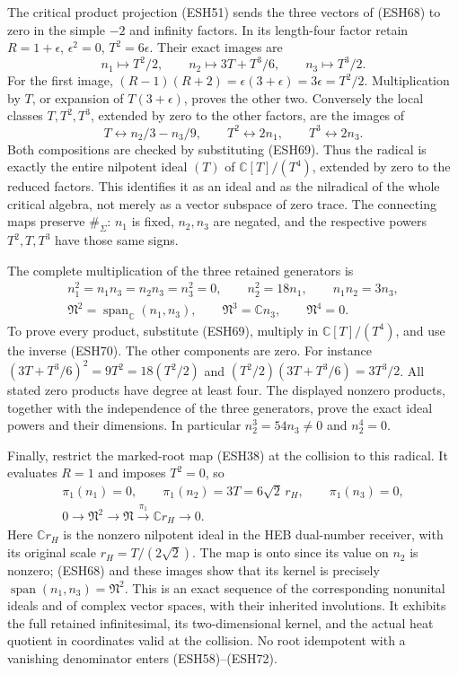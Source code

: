 \documentclass[
  10pt,
  a4paper,
]{article}
\begin{document}
The critical product projection (ESH51) sends the three vectors of
(ESH68) to zero in the simple \(-2\) and infinity factors. In its
length-four factor retain \(R=1+\epsilon\), \(\epsilon^2=0\),
\(T^2=6\epsilon\). Their exact images are \[
n_1\longmapsto T^2/2,\qquad
n_2\longmapsto 3T+T^3/6,\qquad
n_3\longmapsto T^3/2.
\tag{ESH69}
\] For the first image,
\((R-1)(R+2)=\epsilon(3+\epsilon)=3\epsilon=T^2/2\). Multiplication by
\(T\), or expansion of \(T(3+\epsilon)\), proves the other two.
Conversely the local classes \(T,T^2,T^3\), extended by zero to the
other factors, are the images of \[
T\longleftrightarrow n_2/3-n_3/9,\qquad
T^2\longleftrightarrow2n_1,\qquad
T^3\longleftrightarrow2n_3.
\tag{ESH70}
\] Both compositions are checked by substituting (ESH69). Thus the
radical is exactly the entire nilpotent ideal \((T)\) of
\(\mathbb C[T]/(T^4)\), extended by zero to the reduced factors. This
identifies it as an ideal and as the nilradical of the whole critical
algebra, not merely as a vector subspace of zero trace. The connecting
maps preserve \(\#_\Sigma\): \(n_1\) is fixed, \(n_2,n_3\) are negated,
and the respective powers \(T^2,T,T^3\) have those same signs.

The complete multiplication of the three retained generators is \[
\begin{gathered}
n_1^2=n_1n_3=n_2n_3=n_3^2=0,\qquad
n_2^2=18n_1,\qquad n_1n_2=3n_3,\\
\mathfrak N^2=\operatorname{span}_{\mathbb C}(n_1,n_3),\qquad
\mathfrak N^3=\mathbb C n_3,\qquad
\mathfrak N^4=0.
\end{gathered}
\tag{ESH71}
\] To prove every product, substitute (ESH69), multiply in
\(\mathbb C[T]/(T^4)\), and use the inverse (ESH70). The other
components are zero. For instance \((3T+T^3/6)^2=9T^2=18(T^2/2)\) and
\((T^2/2)(3T+T^3/6)=3T^3/2\). All stated zero products have degree at
least four. The displayed nonzero products, together with the
independence of the three generators, prove the exact ideal powers and
their dimensions. In particular \(n_2^3=54n_3\ne0\) and \(n_2^4=0\).

Finally, restrict the marked-root map (ESH38) at the collision to this
radical. It evaluates \(R=1\) and imposes \(T^2=0\), so \[
\begin{gathered}
\pi_1(n_1)=0,\qquad \pi_1(n_2)=3T=6\sqrt2\,r_H,\qquad
\pi_1(n_3)=0,\\
0\longrightarrow\mathfrak N^2
\longrightarrow\mathfrak N
\xrightarrow{\ \pi_1\ }\mathbb C r_H
\longrightarrow0.
\end{gathered}
\tag{ESH72}
\] Here \(\mathbb C r_H\) is the nonzero nilpotent ideal in the HEB
dual-number receiver, with its original scale \(r_H=T/(2\sqrt2)\). The
map is onto since its value on \(n_2\) is nonzero; (ESH68) and these
images show that its kernel is precisely
\(\operatorname{span}(n_1,n_3)=\mathfrak N^2\). This is an exact
sequence of the corresponding nonunital ideals and of complex vector
spaces, with their inherited involutions. It exhibits the full retained
infinitesimal, its two-dimensional kernel, and the actual heat quotient
in coordinates valid at the collision. No root idempotent with a
vanishing denominator enters (ESH58)--(ESH72).
\end{document}
